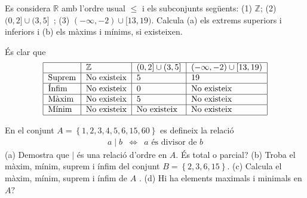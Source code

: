 \begin{exercici}
Es considera $\mathbb{R}$ amb l'ordre usual $\leq $ i els subconjunts següents: (1) $\mathbb{Z}$; (2) $(0,2]\cup (3,5]$\ ; (3) $(-\infty ,-2)\cup
[ 13,19)$. Calcula (a) els extrems superiors i inferiors i (b) els màxims i mínims, si existeixen.
\end{exercici}

\begin{solucio}
És clar que%
\begin{equation*}
\begin{tabular}{|l|l|l|l|}
\hline
& $\mathbb{Z}$ & $(0,2]\cup (3,5]$ & $(-\infty ,-2)\cup [ 13,19)$ \\
\hline
Suprem & No existeix & $5$ & $19$ \\ \hline
Ínfim & No existeix & $0$ & No existeix \\ \hline
Màxim & No existeix & $5$ & No existeix \\ \hline
Mínim & No existeix & No existeix & No existeix \\ \hline
\end{tabular}%
\end{equation*}
\end{solucio}

\begin{exercici}
En el conjunt $A=\left\{ 1,2,3,4,5,6,15,60\right\} $ es defineix la relació%
\begin{equation*}
\begin{array}{ccc}
a\mid b & \Longleftrightarrow & a\text{ és divisor de }b%
\end{array}%
\end{equation*}%
(a) Demostra que $\mid $ és una relació d'ordre en $A$. És total
o parcial? (b) Troba el màxim, mínim, suprem i ínfim del
conjunt $B=\left\{ 2,3,6,15\right\} $. (c) Calcula el màxim, mínim,
suprem i ínfim de $A$ . (d) Hi ha elements maximals i minimals en $A?$
\end{exercici}

